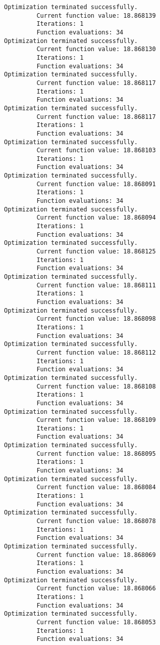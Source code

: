 \documentclass[11pt]{article}
\begin{document}
\begin{Verbatim}[commandchars=\\\{\}]
Optimization terminated successfully.
         Current function value: 18.868139
         Iterations: 1
         Function evaluations: 34
Optimization terminated successfully.
         Current function value: 18.868130
         Iterations: 1
         Function evaluations: 34
Optimization terminated successfully.
         Current function value: 18.868117
         Iterations: 1
         Function evaluations: 34
Optimization terminated successfully.
         Current function value: 18.868117
         Iterations: 1
         Function evaluations: 34
Optimization terminated successfully.
         Current function value: 18.868103
         Iterations: 1
         Function evaluations: 34
Optimization terminated successfully.
         Current function value: 18.868091
         Iterations: 1
         Function evaluations: 34
Optimization terminated successfully.
         Current function value: 18.868094
         Iterations: 1
         Function evaluations: 34
Optimization terminated successfully.
         Current function value: 18.868125
         Iterations: 1
         Function evaluations: 34
Optimization terminated successfully.
         Current function value: 18.868111
         Iterations: 1
         Function evaluations: 34
Optimization terminated successfully.
         Current function value: 18.868098
         Iterations: 1
         Function evaluations: 34
Optimization terminated successfully.
         Current function value: 18.868112
         Iterations: 1
         Function evaluations: 34
Optimization terminated successfully.
         Current function value: 18.868108
         Iterations: 1
         Function evaluations: 34
Optimization terminated successfully.
         Current function value: 18.868109
         Iterations: 1
         Function evaluations: 34
Optimization terminated successfully.
         Current function value: 18.868095
         Iterations: 1
         Function evaluations: 34
Optimization terminated successfully.
         Current function value: 18.868084
         Iterations: 1
         Function evaluations: 34
Optimization terminated successfully.
         Current function value: 18.868078
         Iterations: 1
         Function evaluations: 34
Optimization terminated successfully.
         Current function value: 18.868069
         Iterations: 1
         Function evaluations: 34
Optimization terminated successfully.
         Current function value: 18.868066
         Iterations: 1
         Function evaluations: 34
Optimization terminated successfully.
         Current function value: 18.868053
         Iterations: 1
         Function evaluations: 34

\end{Verbatim}
\end{document}
